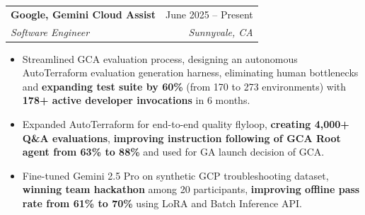 \documentclass[letterpaper,11pt]{article}
\makeatletter
\newcommand{\resumeItem}[1]{
  \item\small{
    {#1 \vspace{-2pt}}
  }
}
\newcommand{\resumeSubheading}[4]{
  \vspace{-2pt}\item
    \begin{tabular*}{0.97\textwidth}[t]{l@{\extracolsep{\fill}}r}
      \textbf{#1} & #2 \\
      \textit{\small#3} & \textit{\small #4} \\
    \end{tabular*}\vspace{-7pt}
}
\newcommand{\resumeSubSubheading}[2]{
    \item
    \begin{tabular*}{0.97\textwidth}{l@{\extracolsep{\fill}}r}
      \textit{\small#1} & \textit{\small #2} \\
    \end{tabular*}\vspace{-7pt}
}
\newcommand{\resumeItemListStart}{\begin{itemize}}
\newcommand{\resumeItemListEnd}{\end{itemize}\vspace{-5pt}}
\makeatother
\begin{document}
    \resumeSubheading{Google, Gemini Cloud Assist}{June 2025 -- Present}{Software Engineer}{Sunnyvale, CA}
    \resumeItemListStart
        \resumeItem{Streamlined GCA evaluation process, designing an autonomous AutoTerraform evaluation generation harness, eliminating human bottlenecks and \textbf{expanding test suite by 60\%} (from 170 to 273 environments) with \textbf{178+ active developer invocations} in 6 months.}
        \resumeItem{Expanded AutoTerraform for end-to-end quality flyloop, \textbf{creating 4,000+ Q\&A evaluations}, \textbf{improving instruction following of GCA Root agent from 63\% to 88\%} and used for GA launch decision of GCA.}
        \resumeItem{Fine-tuned Gemini 2.5 Pro on synthetic GCP troubleshooting dataset, \textbf{winning team hackathon} among 20 participants, \textbf{improving offline pass rate from 61\% to 70\%} using LoRA and Batch Inference API.}
    \resumeItemListEnd
\end{document}
